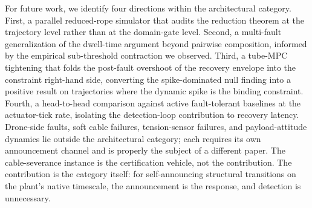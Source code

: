 For future work, we identify four directions within the architectural category. First, a parallel reduced-rope simulator that audits the reduction theorem at the trajectory level rather than at the domain-gate level. Second, a multi-fault generalization of the dwell-time argument beyond pairwise composition, informed by the empirical sub-threshold contraction we observed. Third, a tube-MPC tightening that folds the post-fault overshoot of the recovery envelope into the constraint right-hand side, converting the spike-dominated null finding into a positive result on trajectories where the dynamic spike is the binding constraint. Fourth, a head-to-head comparison against active fault-tolerant baselines at the actuator-tick rate, isolating the detection-loop contribution to recovery latency. Drone-side faults, soft cable failures, tension-sensor failures, and payload-attitude dynamics lie outside the architectural category; each requires its own announcement channel and is properly the subject of a different paper. The cable-severance instance is the certification vehicle, not the contribution. The contribution is the category itself: for self-announcing structural transitions on the plant's native timescale, the announcement is the response, and detection is unnecessary.